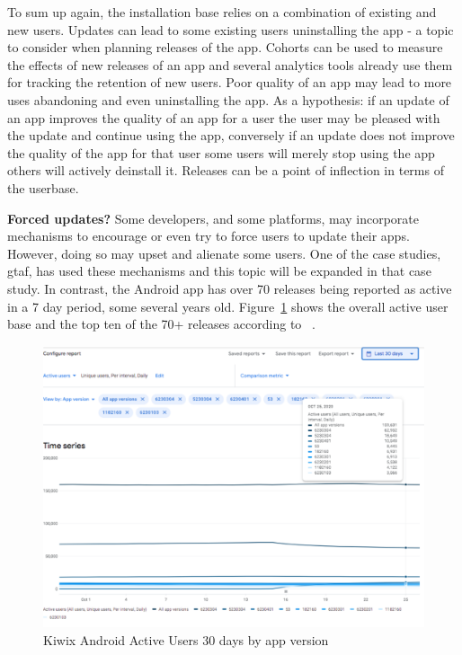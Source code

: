 To sum up again, the installation base relies on a combination of existing and new users. Updates can lead to some existing users uninstalling the app - a topic to consider when planning releases of the app. Cohorts can be used to measure the effects of new releases of an app and several analytics tools already use them for tracking the retention of new users. Poor quality of an app may lead to more uses abandoning and even uninstalling the app. As a hypothesis: if an update of an app improves the quality of an app for a user the user may be pleased with the update and continue using the app, conversely if an update does not improve the quality of the app for that user some users will merely stop using the app others will actively deinstall it. Releases can be a point of inflection in terms of the userbase.

\textbf{Forced updates?} Some developers, and some platforms, may incorporate mechanisms to encourage or even try to force users to update their apps. However, doing so may upset and alienate some users. One of the case studies, \Gls{gtaf}, has used these mechanisms and this topic will be expanded in that case study. In contrast, the  Android app has over 70 releases being reported as active in a 7 day period, some several years old. Figure~\ref{fig:kiwix-30d-active-users} shows the overall active user base and the top ten of the 70+ releases according to ~.

\begin{figure}
    \includegraphics[width=\linewidth]{images/android-vitals-screenshots/kiwix/kiwix-ActiveUsers-30-days-2020-10-29.pdf}
    \caption{Kiwix Android Active Users 30 days by app version}
    \label{fig:kiwix-30d-active-users}
\end{figure}

